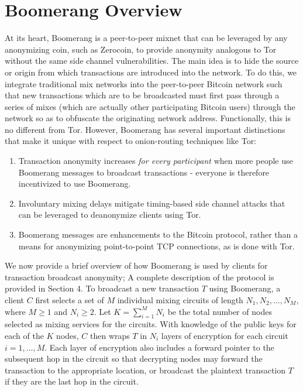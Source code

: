 \section{Boomerang Overview}
At its heart, Boomerang is a peer-to-peer mixnet that can be leveraged by any anonymizing coin, such as Zerocoin, to provide anonymity analogous to Tor without the same side channel vulnerabilities. The main idea is to hide the source or origin from which transactions are introduced into the network. To do this, we integrate traditional mix networks into the peer-to-peer Bitcoin network such that new transactions which are to be broadcasted must first pass through a series of mixes (which are actually other participating Bitcoin users) through the network so as to obfuscate the originating network address. Functionally, this is no different from Tor. However, Boomerang has several important distinctions that make it unique with respect to onion-routing techniques like Tor:
\begin{enumerate}
	\item Transaction anonymity increases \emph{for every participant} when more people use Boomerang messages to broadcast transactions - everyone is therefore incentivized to use Boomerang. 
	\item Involuntary mixing delays mitigate timing-based side channel attacks that can be leveraged to deanonymize clients using Tor. 
	\item Boomerang messages are enhancements to the Bitcoin protocol, rather than a means for anonymizing point-to-point TCP connections, as is done with Tor. 
\end{enumerate}

We now provide a brief overview of how Boomerang is used by clients for transaction broadcast anonymity; A complete description of the protocol is provided in Section 4. To broadcast a new transaction $T$ using Boomerang, a client $C$ first selects a set of $M$ individual mixing circuits of length $N_1,N_2,\dots,N_M$, where $M \geq 1$ and $N_i \geq 2$. Let $K = \sum_{i=1}^MN_i$ be the total number of nodes selected as mixing services for the circuits. With knowledge of the public keys for each of the $K$ nodes, $C$ then wraps $T$ in $N_i$ layers of encryption for each circuit $i = 1,\dots,M$. Each layer of encryption also includes a forward pointer to the subsequent hop in the circuit so that decrypting nodes may forward the transaction to the appropriate location, or broadcast the plaintext transaction $T$ if they are the last hop in the circuit. 


